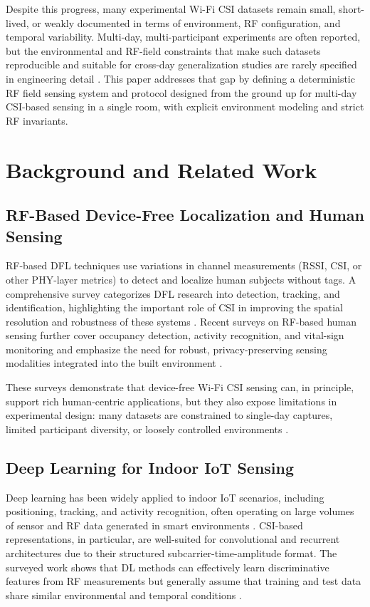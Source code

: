 \documentclass[11pt,a4paper]{article}
\begin{document}
Despite this progress, many experimental Wi-Fi CSI datasets remain small, short-lived, or weakly documented in terms of environment, RF configuration, and temporal variability. Multi-day, multi-participant experiments are often reported, but the environmental and RF-field constraints that make such datasets reproducible and suitable for cross-day generalization studies are rarely specified in engineering detail \cite{shahbazian2023human}. This paper addresses that gap by defining a deterministic RF field sensing system and protocol designed from the ground up for multi-day CSI-based sensing in a single room, with explicit environment modeling and strict RF invariants.

\section{Background and Related Work}

\subsection{RF-Based Device-Free Localization and Human Sensing}

RF-based DFL techniques use variations in channel measurements (RSSI, CSI, or other PHY-layer metrics) to detect and localize human subjects without tags. A comprehensive survey categorizes DFL research into detection, tracking, and identification, highlighting the important role of CSI in improving the spatial resolution and robustness of these systems \cite{denis2019dfl}. Recent surveys on RF-based human sensing further cover occupancy detection, activity recognition, and vital-sign monitoring and emphasize the need for robust, privacy-preserving sensing modalities integrated into the built environment \cite{shahbazian2023human}.

These surveys demonstrate that device-free Wi-Fi CSI sensing can, in principle, support rich human-centric applications, but they also expose limitations in experimental design: many datasets are constrained to single-day captures, limited participant diversity, or loosely controlled environments \cite{denis2019dfl,shahbazian2023human}.

\subsection{Deep Learning for Indoor IoT Sensing}

Deep learning has been widely applied to indoor IoT scenarios, including positioning, tracking, and activity recognition, often operating on large volumes of sensor and RF data generated in smart environments \cite{abdelbasset2021indoor}. CSI-based representations, in particular, are well-suited for convolutional and recurrent architectures due to their structured subcarrier-time-amplitude format. The surveyed work shows that DL methods can effectively learn discriminative features from RF measurements but generally assume that training and test data share similar environmental and temporal conditions \cite{abdelbasset2021indoor}.
\end{document}
